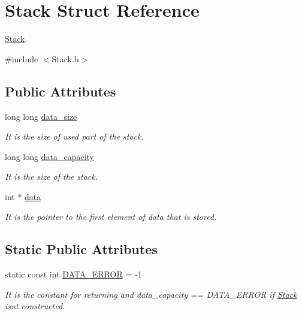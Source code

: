 \hypertarget{struct_stack}{}\section{Stack Struct Reference}
\label{struct_stack}


\mbox{\hyperlink{struct_stack}{Stack}}.  




{\ttfamily \#include $<$Stack.\+h$>$}

\subsection*{Public Attributes}
\begin{DoxyCompactItemize}
\item 
\mbox{\label{struct_stack_acb06e95fc7ce86807220285c5597a8ce}} 
long long \mbox{\hyperlink{struct_stack_acb06e95fc7ce86807220285c5597a8ce}{data\+\_\+size}}
\begin{DoxyCompactList}\small\item\em It is the size of used part of the stack. \end{DoxyCompactList}\item 
\mbox{\label{struct_stack_a53aa2de321a36388d83a53d5ef6737eb}} 
long long \mbox{\hyperlink{struct_stack_a53aa2de321a36388d83a53d5ef6737eb}{data\+\_\+capacity}}
\begin{DoxyCompactList}\small\item\em It is the size of the stack. \end{DoxyCompactList}\item 
\mbox{\label{struct_stack_a63bb6f348d7911e1c65bcc092d42a1e5}} 
int $\ast$ \mbox{\hyperlink{struct_stack_a63bb6f348d7911e1c65bcc092d42a1e5}{data}}
\begin{DoxyCompactList}\small\item\em It is the pointer to the first element of data that is stored. \end{DoxyCompactList}\end{DoxyCompactItemize}
\subsection*{Static Public Attributes}
\begin{DoxyCompactItemize}
\item 
\mbox{\label{struct_stack_ab62f9c8c02faef53723d62a6d2a6068a}} 
static const int \mbox{\hyperlink{struct_stack_ab62f9c8c02faef53723d62a6d2a6068a}{D\+A\+T\+A\+\_\+\+E\+R\+R\+OR}} = -\/1
\begin{DoxyCompactList}\small\item\em It is the constant for returning and data\+\_\+capacity == D\+A\+T\+A\+\_\+\+E\+R\+R\+OR if \mbox{\hyperlink{struct_stack}{Stack}} isn\textquotesingle{}t constructed. \end{DoxyCompactList}\end{DoxyCompactItemize}


